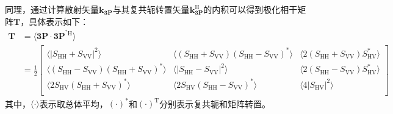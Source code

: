 同理，通过计算散射矢量$\textbf{k}_{\textbf{3P}}$与其复共轭转置矢量$\textbf{k}_{\textbf{3P}}^\text{H}$的内积可以得到极化相干矩阵$\textbf{T}$，具体表示如下：
\begin{equation}
    \label{eq:T}
    \begin{aligned}
        \textbf{T} & =\left. \langle \textbf{3P}\cdot\textbf{3P}^{^*\text{H}} \right. \rangle                                                                                                                                                                                                                                                                                                                                                                                                                                                                                                                              \\
                   & =\frac{1}{2}\left[ \begin{matrix}
                                                \langle \left| S_{\mathrm{HH}}+S_{\mathrm{VV}} \right|^2\rangle                                                                 & \left. \langle \left( S_{\mathrm{HH}}+S_{\mathrm{VV}} \right) \left( S_{\mathrm{HH}}-S_{\mathrm{VV}} \right) ^* \right. \rangle & \left. \langle 2\left( S_{\mathrm{HH}}+S_{\mathrm{VV}} \right) S_{\mathrm{HV}}^{*} \right. \rangle \\
                                                \left. \langle \left( S_{\mathrm{HH}}-S_{\mathrm{VV}} \right) \left( S_{\mathrm{HH}}+S_{\mathrm{VV}} \right) ^* \right. \rangle & \left. \langle \left| S_{\mathrm{HH}}-S_{\mathrm{VV}} \right|^2 \right. \rangle                                                 & \left. \langle 2\left( S_{\mathrm{HH}}-S_{\mathrm{VV}} \right) S_{\mathrm{HV}}^{*} \right. \rangle \\
                                                \left. \langle 2S_{\mathrm{HV}}\left( S_{\mathrm{HH}}+S_{\mathrm{VV}} \right) ^* \right. \rangle                                & \left. \langle 2S_{\mathrm{HV}}\left( S_{\mathrm{HH}}-S_{\mathrm{VV}} \right) ^* \right. \rangle                                & \left. \langle 4\left| S_{\mathrm{HV}} \right|^2 \right. \rangle                                   \\
                                            \end{matrix} \right]
    \end{aligned}
\end{equation}
其中，$\langle \cdot \rangle$表示取总体平均，$(\cdot)^*$和$(\cdot)^\text{T}$分别表示复共轭和矩阵转置。

